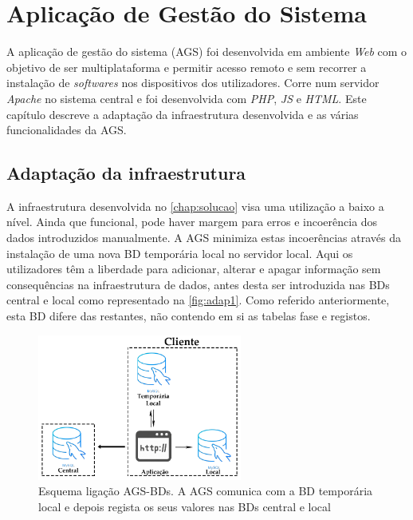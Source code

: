 \documentclass[11pt,twoside,a4paper]{report}
\begin{document}
\cleardoublepage
\chapter{Aplicação de Gestão do Sistema}
\label{chap:aplicacao}
A aplicação de gestão do sistema (AGS) foi desenvolvida em ambiente \textit{Web} com o objetivo de ser multiplataforma e permitir acesso remoto e sem recorrer a instalação de \textit{softwares} nos dispositivos dos utilizadores. Corre num servidor \textit{Apache} no sistema central e foi desenvolvida com \textit{PHP}, \textit{JS} e \textit{HTML}. Este capítulo descreve a adaptação da infraestrutura desenvolvida e as várias funcionalidades da AGS.

\section{Adaptação da infraestrutura}
\label{subchap:adap}
A infraestrutura desenvolvida no \autoref{chap:solucao} visa uma utilização a baixo a nível. Ainda que funcional, pode haver margem para erros e incoerência dos dados introduzidos manualmente. A AGS minimiza estas incoerências através da instalação de uma nova BD temporária local no servidor local. Aqui os utilizadores têm a liberdade para adicionar, alterar e apagar informação sem consequências na infraestrutura de dados, antes desta ser introduzida nas BDs central e local como representado na \autoref{fig:adap1}. Como referido anteriormente, esta BD difere das restantes, não contendo em si as tabelas fase e registos.
\begin{figure}[H]
	\begin{center}
		\includegraphics[width=0.60\textwidth]{Aplicacao_temp_local_central} %
		\caption[Esquema de ligação AGS-BDs]{Esquema ligação AGS-BDs. A AGS comunica com a BD temporária local e depois regista os seus valores nas BDs central e local}
		\label{fig:adap1}
	\end{center}
\end{figure}
\end{document}
